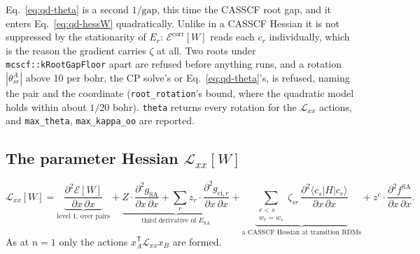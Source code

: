 \documentclass[11pt]{article}
\newcommand{\code}[1]{\texttt{#1}}
\newcommand{\Lag}{\mathcal L}
\newcommand{\T}{\mathsf T}
\begin{document}
Eq.~\eqref{eq:qd-theta} is a second $1/\text{gap}$, this time the CASSCF
root gap, and it enters Eq.~\eqref{eq:qd-hessW} quadratically. Unlike in a
CASSCF Hessian it is not suppressed by the stationarity of $E_r$:
$\mathcal E^{\mathrm{corr}}[W]$ reads each $c_r$ individually, which is the
reason the gradient carries $\zeta$ at all. Two roots under
\code{mcscf::kRootGapFloor} apart are refused before anything runs, and a
rotation $|\theta^A_{sr}|$ above 10 per bohr, the CP solve's or
Eq.~\eqref{eq:qd-theta}'s, is refused, naming the pair and the coordinate
(\code{root\_rotation}'s bound, where the quadratic model holds within about
$1/20$ bohr). \code{theta} returns every rotation for the $\Lag_{xx}$
actions, and \code{max\_theta}, \code{max\_kappa\_oo} are reported.

\subsection{The parameter Hessian \texorpdfstring{$\Lag_{xx}[W]$}{L\_xx[W]}}
\label{sec:qd-Lxx}

\begin{equation}
  \Lag_{xx}[W] =
  \underbrace{\frac{\partial^2\mathcal E[W]}{\partial x\,\partial x}}_{\text{level 1, over pairs}}
  + \underbrace{Z\cdot\frac{\partial^2 g_{\mathrm{SA}}}{\partial x\,\partial x}
    + \sum_r z_r\cdot\frac{\partial^2 g_{\mathrm{ci},r}}{\partial x\,\partial x}}_{\text{third derivative of }E_{\mathrm{SA}}}
  + \underbrace{\sum_{\substack{r<s\\w_r=w_s}}\zeta_{sr}\,
    \frac{\partial^2\langle c_s|H|c_r\rangle}{\partial x\,\partial x}}_{\text{a CASSCF Hessian at transition RDMs}}
  + z^c\cdot\frac{\partial^2 f^{\mathrm{SA}}}{\partial x\,\partial x}.
  \label{eq:qd-Lxx}
\end{equation}
As at $n = 1$ only the actions $x_A^\T\Lag_{xx}x_B$ are formed.
\end{document}

